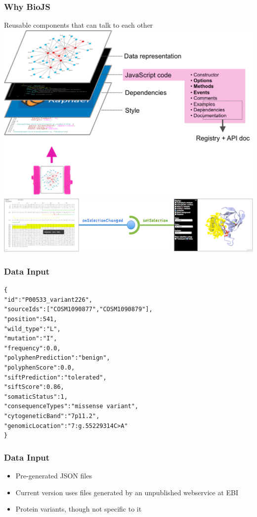 \documentclass[10pt, compress]{beamer}
\renewcommand{\(}{\begin{columns}}
\renewcommand{\)}{\end{columns}}
\newcommand{\<}[1]{\begin{column}{#1}}
\renewcommand{\>}{\end{column}}
\begin{document}
\begin{frame}
\frametitle{Why BioJS}
Reusable components that can talk to each other
\includegraphics[scale=0.15]{images/biojs_component_layers}\\
\includegraphics[width=\linewidth]{images/biojs_events}
\end{frame}




\begin{frame}[fragile]
\frametitle{Data Input}
\begin{verbatim}
{
"id":"P00533_variant226",
"sourceIds":["COSM1090877","COSM1090879"],
"position":541,
"wild_type":"L",
"mutation":"I",
"frequency":0.0,
"polyphenPrediction":"benign",
"polyphenScore":0.0,
"siftPrediction":"tolerated",
"siftScore":0.86,
"somaticStatus":1,
"consequenceTypes":"missense variant",
"cytogeneticBand":"7p11.2",
"genomicLocation":"7:g.55229314C>A"
}
\end{verbatim}
\end{frame}

\begin{frame}[fragile]
\frametitle{Data Input}
\begin{itemize}
\item Pre-generated JSON files
\item Current version uses files generated by an unpublished webservice at EBI
\item Protein variants, though not specific to it
\end{itemize}
\end{frame}
\end{document}
